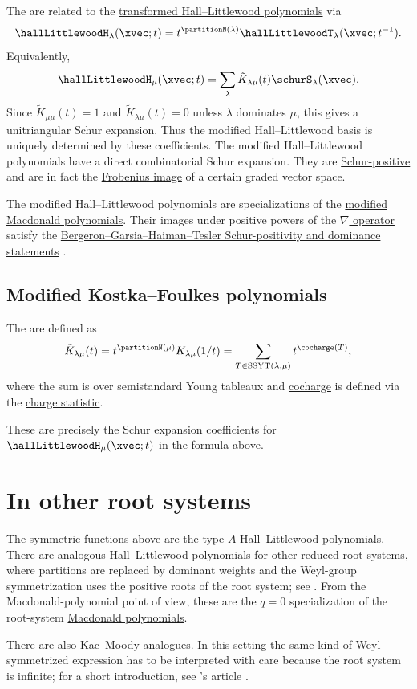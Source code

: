 The \label{modifiedHallLittlewoodPolynomial}
are related to
the \hyperref[hallLittlewoodT]{transformed Hall--Littlewood polynomials} via
\[
\hallLittlewoodH_\lambda(\xvec;t)
=
t^{\partitionN(\lambda)} \hallLittlewoodT_\lambda(\xvec;t^{-1}).
\]
Equivalently,
\[
\hallLittlewoodH_\mu(\xvec;t)
=
\sum_{\lambda}\tilde{K}_{\lambda\mu}(t)\schurS_\lambda(\xvec).
\]
Since $\tilde{K}_{\mu\mu}(t)=1$ and
$\tilde{K}_{\lambda\mu}(t)=0$ unless $\lambda$ dominates $\mu$, this gives a
unitriangular Schur expansion.  Thus the modified Hall--Littlewood basis is
uniquely determined by these coefficients.
The modified Hall--Littlewood polynomials have a direct combinatorial Schur
expansion.  They are \hyperref[schurPositiveDefinition]{Schur-positive} and
are in fact the \hyperref[frobeniusCharacteristic]{Frobenius image} of a
certain graded vector space.

The modified Hall--Littlewood polynomials are specializations of the
\hyperref[macdonaldH]{modified Macdonald polynomials}.
Their images under positive powers of the
\hyperref[nablaOperator]{$\nabla$ operator} satisfy the
\hyperref[nablaHallLittlewoodBGHT]{Bergeron--Garsia--Haiman--Tesler
Schur-positivity and dominance statements} \cite{GuKangQiuZhang2026x}.


\subsection[modifiedKostkaFoulkesPolynomials]{Modified Kostka--Foulkes polynomials}

The  are defined as
\[
\tilde{K}_{\lambda\mu}(t)
=
t^{\partitionN(\mu)}K_{\lambda\mu}(1/t)
=
\sum_{T \in \mathrm{SSYT}(\lambda,\mu)} t^{\cocharge(T)},
\]
where the sum is over semistandard Young tableaux and
\hyperref[cochargeStatistic]{cocharge} is
defined via the \hyperref[computingKostkaFoulkes]{charge statistic}.

These are precisely the Schur expansion coefficients for
$\hallLittlewoodH_\mu(\xvec;t)$ in the formula above.



\section[hallLittlewoodOtherRootSystems]{In other root systems}

The symmetric functions above are the type $A$ Hall--Littlewood polynomials.
There are analogous Hall--Littlewood polynomials for other reduced root
systems, where partitions are replaced by dominant weights and the Weyl-group
symmetrization uses the positive roots of the root system; see
\cite[Ch.~V, \S5]{Macdonald1995}.  From the Macdonald-polynomial point of
view, these are the $q=0$ specialization of the root-system
\hyperref[macdonaldP]{Macdonald polynomials}.

There are also Kac--Moody analogues.  In this setting the same kind of
Weyl-symmetrized expression has to be interpreted with care because the root
system is infinite; for a short introduction, see
's article
\cite{Viswanath2006x}.
